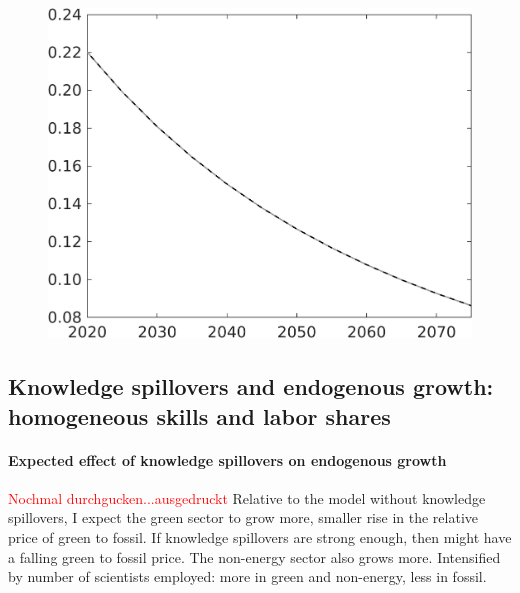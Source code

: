 \documentclass[12pt]{article}
\newcommand{\tr}[1]{\textcolor{red}{#1}}
\begin{document}
\begin{figure}
\begin{minipage}[]{0.32\textwidth}
\end{minipage}	
\begin{minipage}[]{0.32\textwidth}
\includegraphics[width=1\textwidth]{../../codding_model/own_basedOnFried/optimalPol_010922_revision/figures/all_13Sept22/CompTaul_Equlab_LFBAU_Reg0_sg_spillover0_nsk1_xgr0_knspil1_sep1_countec0_GovRev0_etaa0.79_lgd0.png}
\end{minipage}	
\end{figure}

\clearpage
\newpage

\subsection{Knowledge spillovers and endogenous growth: homogeneous skills and labor shares}
\paragraph{Expected effect of knowledge spillovers on endogenous growth}
\tr{Nochmal durchgucken...ausgedruckt}
Relative to the model without knowledge spillovers, I expect the green sector to grow more, smaller rise in the relative price of green to fossil. If knowledge spillovers are strong enough, then might have a falling green to fossil price. The non-energy sector also grows more. Intensified by number of scientists employed: more in green and non-energy, less in fossil. %
\end{document}
